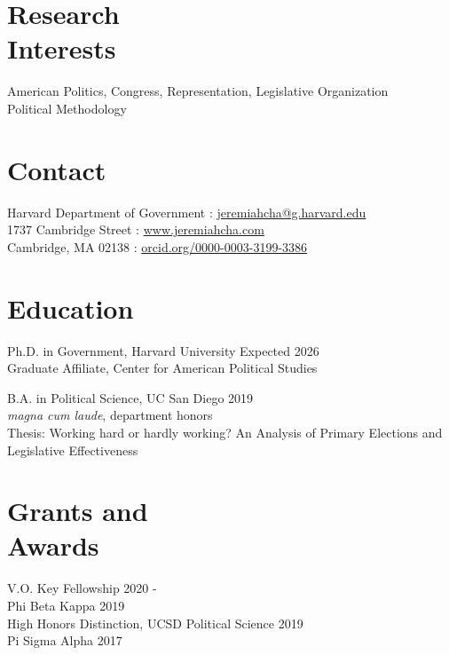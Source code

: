 \documentclass[margin, line]{res}
\begin{document}
\begin{resume}

\section{Research\\Interests}
American Politics, Congress, Representation, Legislative Organization\\
Political Methodology

\section{Contact}
Harvard Department of Government \hfill \Letter: \href{mailto:jeremiahcha@g.harvard.edu}{jeremiahcha@g.harvard.edu}\\
1737 Cambridge Street \hfill \Mundus: \href{httsp://www.jeremiahcha.com}{www.jeremiahcha.com}\\
Cambridge, MA 02138 \hfill \Mundus: \href{https://orcid.org/0000-0003-3199-3386}{orcid.org/0000-0003-3199-3386}

\section{Education}
Ph.D. in Government, Harvard University \hfill Expected 2026\\
\hspace*{5mm}Graduate Affiliate, Center for American Political Studies

B.A. in Political Science, UC San Diego \hfill 2019\\
\hspace*{5mm}\textit{magna cum laude}, department honors\\
\hspace*{5mm}Thesis: Working hard or hardly working? An Analysis of Primary Elections and\\ 
\hspace*{18mm}Legislative Effectiveness

\section{Grants and \\Awards}
V.O. Key Fellowship \hfill 2020 - \\
Phi Beta Kappa \hfill 2019\\
High Honors Distinction, UCSD Political Science \hfill 2019\\
Pi Sigma Alpha \hfill 2017



\end{resume}
\end{document}
